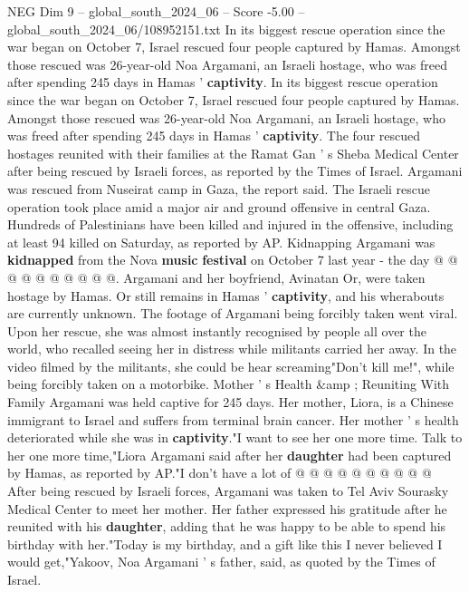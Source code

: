 \begin{textsample}{NEG Dim 9 – global\_south\_2024\_06 – Score -5.00 – global\_south\_2024\_06/108952151.txt}  \label{ex:f9_neg_357}
In its biggest rescue operation since the war began on October 7, Israel rescued four people captured by Hamas.
Amongst those rescued was 26-year-old Noa Argamani, an Israeli hostage, who was freed after spending 245 days in Hamas ' \textbf{captivity}.
In its biggest rescue operation since the war began on October 7, Israel rescued four people captured by Hamas.
Amongst those rescued was 26-year-old Noa Argamani, an Israeli hostage, who was freed after spending 245 days in Hamas ' \textbf{captivity}.
The four rescued hostages reunited with their families at the Ramat Gan ' s Sheba Medical Center after being rescued by Israeli forces, as reported by the Times of Israel.
Argamani was rescued from Nuseirat camp in Gaza, the report said.
The Israeli rescue operation took place amid a major air and ground offensive in central Gaza.
Hundreds of Palestinians have been killed and injured in the offensive, including at least 94 killed on Saturday, as reported by AP.
Kidnapping Argamani was \textbf{kidnapped} from the Nova \textbf{music} \textbf{festival} on October 7 last year - the day @ @ @ @ @ @ @ @ @ @.
Argamani and her boyfriend, Avinatan Or, were taken hostage by Hamas.
Or still remains in Hamas ' \textbf{captivity}, and his wherabouts are currently unknown.
The footage of Argamani being forcibly taken went viral.
Upon her rescue, she was almost instantly recognised by people all over the world, who recalled seeing her in distress while militants carried her away.
In the video filmed by the militants, she could be hear screaming"Don't kill me!", while being forcibly taken on a motorbike.
Mother ' s Health \&amp ; Reuniting With Family Argamani was held captive for 245 days.
Her mother, Liora, is a Chinese immigrant to Israel and suffers from terminal brain cancer.
Her mother ' s health deteriorated while she was in \textbf{captivity}."I want to see her one more time.
Talk to her one more time,"Liora Argamani said after her \textbf{daughter} had been captured by Hamas, as reported by AP."I don't have a lot of @ @ @ @ @ @ @ @ @ @ After being rescued by Israeli forces, Argamani was taken to Tel Aviv Sourasky Medical Center to meet her mother.
Her father expressed his gratitude after he reunited with his \textbf{daughter}, adding that he was happy to be able to spend his birthday with her."Today is my birthday, and a gift like this I never believed I would get,"Yakoov, Noa Argamani ' s father, said, as quoted by the Times of Israel.

\end{textsample}
